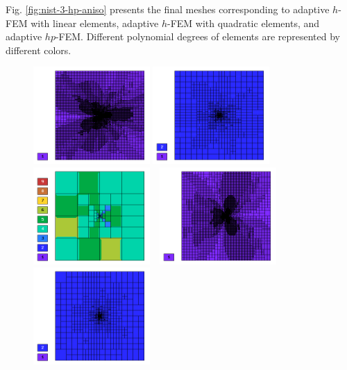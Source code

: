 \documentclass[12pt]{elsarticle}
\begin{document}
Fig. \ref{fig:nist-3-hp-aniso} presents the final meshes corresponding to adaptive $h$-FEM with
linear elements, adaptive $h$-FEM with quadratic elements, and adaptive $hp$-FEM. Different
polynomial degrees of elements are represented by different colors.

\begin{figure}[!ht]
\centering
\includegraphics[height=3.7cm]{nist/nist-3/mesh_u_h1_aniso.png}
\includegraphics[height=3.7cm]{nist/nist-3/mesh_u_h2_aniso.png}
\includegraphics[height=3.7cm]{nist/nist-3/mesh_u_hp_anisoh.png}\ \
\includegraphics[height=3.7cm]{nist/nist-3/mesh_v_h1_aniso.png}
\includegraphics[height=3.7cm]{nist/nist-3/mesh_v_h2_aniso.png}

\end{figure}
\end{document}

